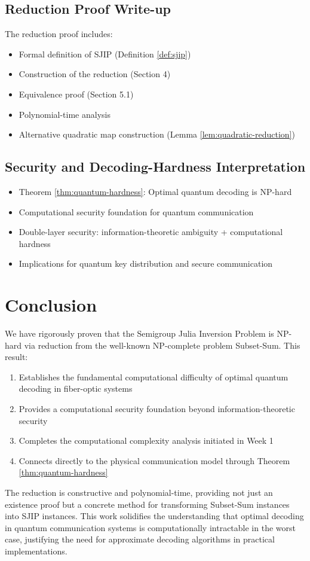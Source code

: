 \documentclass[11pt]{article}
\begin{document}
\subsection{Reduction Proof Write-up}
The reduction proof includes:
\begin{itemize}
    \item Formal definition of \textsc{SJIP} (Definition \ref{def:sjip})
    \item Construction of the reduction (Section 4)
    \item Equivalence proof (Section 5.1)
    \item Polynomial-time analysis
    \item Alternative quadratic map construction (Lemma \ref{lem:quadratic-reduction})
\end{itemize}

\subsection{Security and Decoding-Hardness Interpretation}
\begin{itemize}
    \item Theorem \ref{thm:quantum-hardness}: Optimal quantum decoding is NP-hard
    \item Computational security foundation for quantum communication
    \item Double-layer security: information-theoretic ambiguity + computational hardness
    \item Implications for quantum key distribution and secure communication
\end{itemize}

\section{Conclusion}
We have rigorously proven that the Semigroup Julia Inversion Problem is NP-hard via reduction from the well-known NP-complete problem Subset-Sum. This result:

\begin{enumerate}
    \item Establishes the fundamental computational difficulty of optimal quantum decoding in fiber-optic systems
    \item Provides a computational security foundation beyond information-theoretic security
    \item Completes the computational complexity analysis initiated in Week 1
    \item Connects directly to the physical communication model through Theorem \ref{thm:quantum-hardness}
\end{enumerate}

The reduction is constructive and polynomial-time, providing not just an existence proof but a concrete method for transforming Subset-Sum instances into SJIP instances. This work solidifies the understanding that optimal decoding in quantum communication systems is computationally intractable in the worst case, justifying the need for approximate decoding algorithms in practical implementations.
\end{document}
